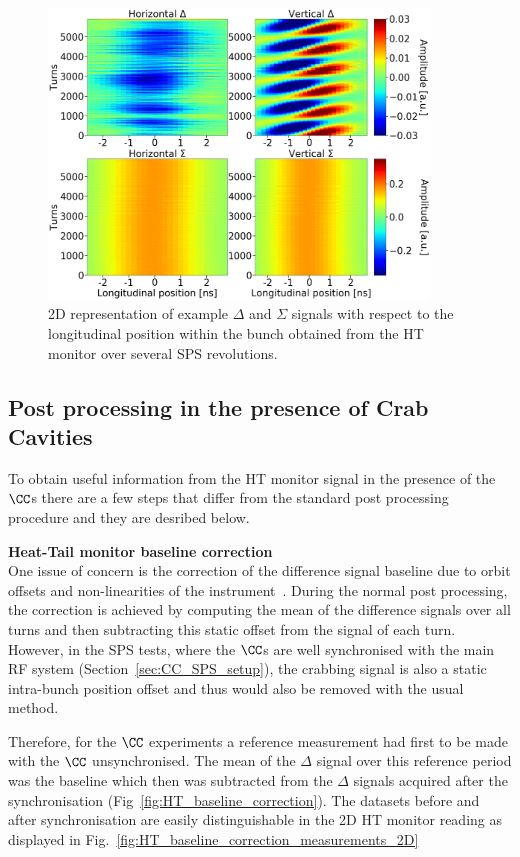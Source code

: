 \begin{figure}[!h]
   \centering         
   \includegraphics[width=0.9\textwidth]{images/Ch4/HT_2D__20180530_135105_colorbar_new_version.png}
       \caption{2D representation of example $\Delta$ and $\Sigma$ signals with respect to the longitudinal position within the bunch obtained from the HT monitor over several SPS revolutions.}
       \label{fig:HT_example_signals_2D}
\end{figure}


\subsection{Post processing in the presence of Crab Cavities}\label{subsec:HT_post_process_CC}
To obtain useful information from the HT monitor signal in the presence of the $\CC$s there are a few steps that differ from the standard post processing procedure and they are desribed below.

\normalsize{\textbf{Heat-Tail monitor baseline correction}}\\
One issue of concern is the correction of the difference signal  baseline due to orbit offsets and non-linearities of the instrument~\cite{Levens:2313358}. During the normal post processing, the correction is achieved by computing the mean of the difference signals over all turns and then subtracting this static offset from the signal of each turn. However, in the SPS tests, where the $\CC$s are well synchronised with the main RF system (Section~\ref{sec:CC_SPS_setup}), the crabbing signal is also a static intra-bunch position offset and thus would also be removed with the usual method.

Therefore, for the $\CC$ experiments a reference measurement had first to be made with the $\CC$ unsynchronised. The mean of the $\Delta$ signal over this reference period was the baseline which then was subtracted from the $\Delta$ signals acquired after the synchronisation (Fig~\ref{fig:HT_baseline_correction}). The datasets before and after synchronisation are easily distinguishable in the 2D HT monitor reading as displayed in Fig.~\ref{fig:HT_baseline_correction_measurements_2D}



